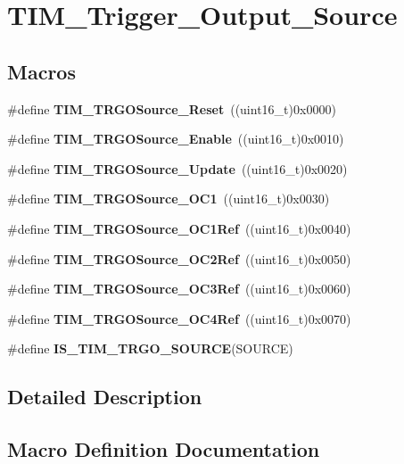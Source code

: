 \section{T\+I\+M\+\_\+\+Trigger\+\_\+\+Output\+\_\+\+Source}
\label{group__TIM__Trigger__Output__Source}
\subsection*{Macros}
\begin{DoxyCompactItemize}
\item 
\#define \textbf{ T\+I\+M\+\_\+\+T\+R\+G\+O\+Source\+\_\+\+Reset}~((uint16\+\_\+t)0x0000)
\item 
\#define \textbf{ T\+I\+M\+\_\+\+T\+R\+G\+O\+Source\+\_\+\+Enable}~((uint16\+\_\+t)0x0010)
\item 
\#define \textbf{ T\+I\+M\+\_\+\+T\+R\+G\+O\+Source\+\_\+\+Update}~((uint16\+\_\+t)0x0020)
\item 
\#define \textbf{ T\+I\+M\+\_\+\+T\+R\+G\+O\+Source\+\_\+\+O\+C1}~((uint16\+\_\+t)0x0030)
\item 
\#define \textbf{ T\+I\+M\+\_\+\+T\+R\+G\+O\+Source\+\_\+\+O\+C1\+Ref}~((uint16\+\_\+t)0x0040)
\item 
\#define \textbf{ T\+I\+M\+\_\+\+T\+R\+G\+O\+Source\+\_\+\+O\+C2\+Ref}~((uint16\+\_\+t)0x0050)
\item 
\#define \textbf{ T\+I\+M\+\_\+\+T\+R\+G\+O\+Source\+\_\+\+O\+C3\+Ref}~((uint16\+\_\+t)0x0060)
\item 
\#define \textbf{ T\+I\+M\+\_\+\+T\+R\+G\+O\+Source\+\_\+\+O\+C4\+Ref}~((uint16\+\_\+t)0x0070)
\item 
\#define \textbf{ I\+S\+\_\+\+T\+I\+M\+\_\+\+T\+R\+G\+O\+\_\+\+S\+O\+U\+R\+CE}(S\+O\+U\+R\+CE)
\end{DoxyCompactItemize}


\subsection{Detailed Description}


\subsection{Macro Definition Documentation}
\mbox{\label{group__TIM__Trigger__Output__Source_gadf4e4e0422bd9c108b184884781d2d46}} 
